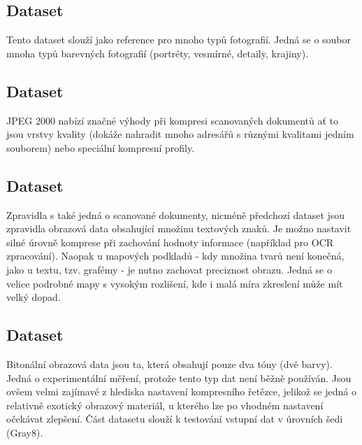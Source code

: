 \subsection*{Dataset }
Tento dataset slouží jako reference pro mnoho typů fotografií. Jedná se o soubor mnoha typů barevných fotografií (portréty, vesmírné, detaily, krajiny).

\subsection*{Dataset }
JPEG 2000 nabízí značné výhody při kompresi scanovaných dokumentů ať to jsou vrstvy kvality (dokáže nahradit mnoho adresářů s různými kvalitami jedním souborem) nebo speciální kompresní profily.

\subsection*{Dataset }
Zpravidla s také jedná o scanované dokumenty, nicméně předchozí dataset jsou zpravidla obrazová data obsahující množinu textových znaků. Je možno nastavit silné úrovně komprese při zachování hodnoty informace (například pro OCR zpracování). Naopak u mapových podkladů - kdy množina tvarů není konečná, jako u textu, tzv. grafémy - je nutno zachovat preciznost obrazu. Jedná se o velice podrobné mapy s vysokým rozlišení, kde i malá míra zkreslení může mít velký dopad.

\subsection*{Dataset }
Bitonální obrazová data jsou ta, která obsahují pouze dva tóny (dvě barvy). Jedná o experimentální měření, protože tento typ dat není běžně používán. Jsou ovšem velmi zajímavé z hlediska nastavení kompresního řetězce, jelikož se jedná o relativně exotický obrazový materiál, u kterého lze po vhodném nastavení očekávat zlepšení. Část datasetu slouží k testování vstupní dat v úrovních šedi (Gray8).

